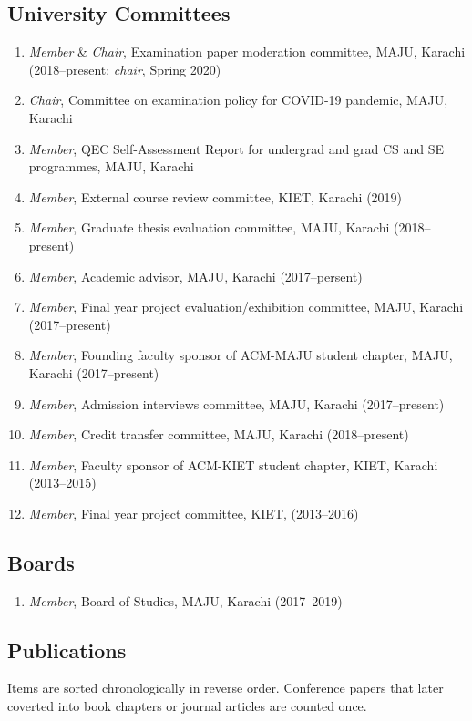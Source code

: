 \documentclass[a4paper, 10pt]{article}
\begin{document}
\subsection*{\textcolor{NavyBlue}{University Committees}}
\begin{enumerate}
\itemsep-4pt
\item {\it Member} \& {\it Chair}, Examination paper moderation committee, MAJU, Karachi (2018--present; \emph{chair}, Spring 2020)
\item {\it Chair}, Committee on examination policy for COVID-19 pandemic, MAJU, Karachi
\item {\it Member}, QEC Self-Assessment Report for undergrad and grad CS and SE programmes, MAJU, Karachi
\item {\it Member}, External course review committee, KIET, Karachi (2019)
\item {\it Member}, Graduate thesis evaluation committee, MAJU, Karachi (2018--present)
\item {\it Member}, Academic advisor, MAJU, Karachi (2017--persent)
\item{\it Member}, Final year project evaluation/exhibition committee, MAJU, Karachi (2017--present)
\item {\it Member}, Founding faculty sponsor of ACM-MAJU student chapter, MAJU, Karachi (2017--present)
\item {\it Member}, Admission interviews committee, MAJU, Karachi (2017--present)
\item {\it Member}, Credit transfer committee, MAJU, Karachi (2018--present)
\item {\it Member}, Faculty sponsor of ACM-KIET student chapter, KIET, Karachi (2013--2015)
\item {\it Member}, Final year project committee, KIET, (2013--2016)
\end{enumerate}

\subsection*{\textcolor{NavyBlue}{Boards}}
\begin{enumerate}
\itemsep-4pt
\item {\it Member}, Board of Studies, MAJU, Karachi (2017--2019)
\end{enumerate}

\subsection*{\textcolor{NavyBlue}{Publications}}
\label{publications}
\vspace{-1em}Items are sorted chronologically in reverse order. Conference papers that later coverted into book chapters or journal articles are counted once.
\end{document}
